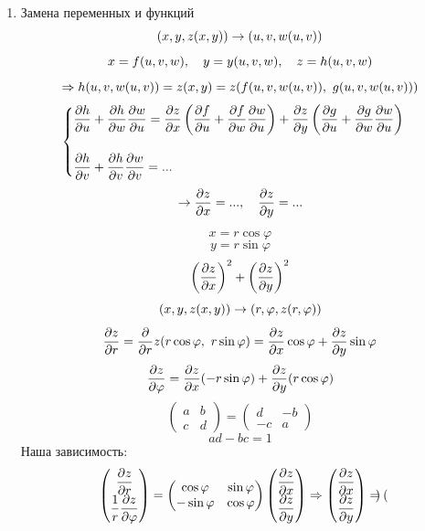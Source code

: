 \documentclass[12pt, fleqn]{article}
\begin{document}
\begin{enumerate}
  \item Замена переменных и функций
  \[(x,y, z(x,y)) \rightarrow (u,v, w(u,v))\]
  \[x = f(u,v,w),\quad y=y(u,v,w),\quad z = h(u,v,w)\]
  \[\Ra h(u,v,w(u,v)) = z(x,y) = z(f(u,v,w(u,v)),\ g(u,v,w(u,v)))\]
  \[\begin{cases}
    \dfrac{\partial h}{\partial u} + \dfrac{\partial h}{\partial w} \dfrac{\partial w}{\partial u} = \dfrac{\partial z}{\partial x} \left(\dfrac{\partial f}{\partial u} + \dfrac{\partial f}{\partial w} \dfrac{\partial w}{\partial u}\right) + \dfrac{\partial z}{\partial y} \left(\dfrac{\partial g}{\partial u} + \dfrac{\partial g}{\partial w} \dfrac{\partial w}{\partial u}\right)\\ \\
    \dfrac{\partial h}{\partial v} + \dfrac{\partial h}{\partial v} \dfrac{\partial w}{\partial v} = ...
  \end{cases}\]
  \[\rightarrow \dfrac{\partial z}{\partial x} = ...,\quad \dfrac{\partial z}{\partial y} = ...\]

  \begin{Example}
    \[x = r \cos \varphi\]
    \[y = r \sin \varphi\]
    \[\left(\dfrac{\partial z}{\partial x}\right)^2 + \left(\dfrac{\partial z}{\partial y}\right)^2\]
    \[(x,y,z(x,y)) \rightarrow (r,\varphi, z(r,\varphi))\]
    \[\dfrac{\partial z}{\partial r} = \dfrac{\partial }{\partial r} z (r \cos \varphi,\ r \sin\varphi) = \dfrac{\partial z}{\partial x} \cos \varphi + \dfrac{\partial z}{\partial y} \sin \varphi\]
    \[\dfrac{\partial z}{\partial \varphi} = \dfrac{\partial z}{\partial x} (-r \sin \varphi) + \dfrac{\partial z}{\partial y}(r \cos \varphi)\]
    \[\begin{pmatrix}
      a & b\\
      c & d
    \end{pmatrix} = \begin{pmatrix}
      d & -b\\
      -c & a
    \end{pmatrix}\]
    \[ad - bc = 1\]
    Наша зависимость:
    \[\begin{pmatrix}
      \dfrac{\partial z}{\partial r}\\
      \dfrac{1}{r} \dfrac{\partial z}{\partial \varphi}
    \end{pmatrix} = \begin{pmatrix}
      \cos \varphi & \sin \varphi\\
      -\sin \varphi & \cos \varphi
    \end{pmatrix} \begin{pmatrix}
      \dfrac{\partial z}{\partial x}\\
      \dfrac{\partial z}{\partial y}
    \end{pmatrix} \Rightarrow \begin{pmatrix}
      \dfrac{\partial z}{\partial x}\\
      \dfrac{\partial z}{\partial y}
    \end{pmatrix} = \begin{pmatrix}

\end{pmatrix}\]
\end{Example}
\end{enumerate}
\end{document}
